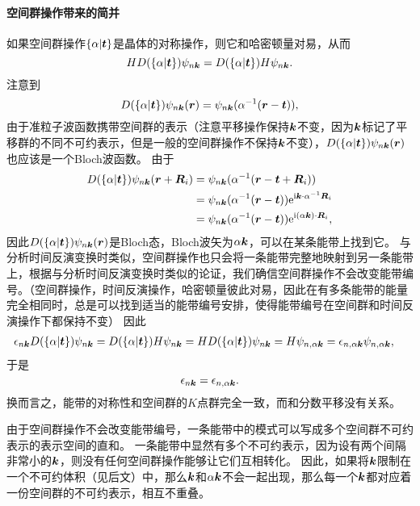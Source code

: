 \paragraph{空间群操作带来的简并} 如果空间群操作$\{ \alpha | \vb*{t} \}$是晶体的对称操作，则它和哈密顿量对易，从而
\[
    H D(\{ \alpha | \vb*{t} \}) \psi_{n \vb*{k}} = D(\{ \alpha | \vb*{t} \}) H \psi_{n \vb*{k}}.
\]
注意到
\[
    D(\{ \alpha | \vb*{t} \}) \psi_{n \vb*{k}} (\vb*{r}) = \psi_{n \vb*{k}} (\alpha^{-1} (\vb*{r} - \vb*{t})),
\]
由于准粒子波函数携带空间群的表示（注意平移操作保持$\vb*{k}$不变，因为$\vb*{k}$标记了平移群的不同不可约表示，但是一般的空间群操作不保持$\vb*{k}$不变），$D(\{ \alpha | \vb*{t} \}) \psi_{n \vb*{k}} (\vb*{r})$也应该是一个Bloch波函数。
由于
\[
    \begin{aligned}
        D(\{ \alpha | \vb*{t} \}) \psi_{n \vb*{k}} (\vb*{r} + \vb*{R}_i) &= \psi_{n \vb*{k}} (\alpha^{-1} (\vb*{r} - \vb*{t} + \vb*{R}_i)) \\
        &= \psi_{n \vb*{k}} (\alpha^{-1} (\vb*{r} - \vb*{t})) \mathrm{e}^{\mathrm{i} \vb*{k} \cdot \alpha^{-1} \vb*{R}_i} \\
        &= \psi_{n \vb*{k}} (\alpha^{-1} (\vb*{r} - \vb*{t})) \mathrm{e}^{\mathrm{i} (\alpha \vb*{k}) \cdot \vb*{R}_i} ,
    \end{aligned}
\]
因此$D(\{ \alpha | \vb*{t} \}) \psi_{n \vb*{k}} (\vb*{r})$是Bloch态，Bloch波矢为$\alpha \vb*{k}$，可以在某条能带上找到它。
与分析时间反演变换时类似，空间群操作也只会将一条能带完整地映射到另一条能带上，根据与分析时间反演变换时类似的论证，我们确信空间群操作不会改变能带编号。（空间群操作，时间反演操作，哈密顿量彼此对易，因此在有多条能带的能量完全相同时，总是可以找到适当的能带编号安排，使得能带编号在空间群和时间反演操作下都保持不变）
因此
\[
    \begin{aligned}
        \epsilon_{n \vb*{k}} D(\{\alpha | \vb*{t}\}) \psi_{n \vb*{k}} &= D(\{ \alpha | \vb*{t} \}) H \psi_{n \vb*{k}} = H D(\{ \alpha | \vb*{t} \}) \psi_{n \vb*{k}} = H \psi_{n, \alpha \vb*{k}} = \epsilon_{n, \alpha \vb*{k}} \psi_{n, \alpha \vb*{k}},
    \end{aligned}
\]
于是
\begin{equation}
    \epsilon_{n \vb*{k}} = \epsilon_{n, \alpha \vb*{k}}.
\end{equation}
换而言之，能带的对称性和空间群的$K$点群完全一致，而和分数平移没有关系。

由于空间群操作不会改变能带编号，一条能带中的模式可以写成多个空间群不可约表示的表示空间的直和。
一条能带中显然有多个不可约表示，因为设有两个间隔非常小的$\vb*{k}$，则没有任何空间群操作能够让它们互相转化。
因此，如果将$\vb*{k}$限制在一个不可约体积（见后文）中，那么$\vb*{k}$和$\alpha \vb*{k}$不会一起出现，那么每一个$\vb*{k}$都对应着一份空间群的不可约表示，相互不重叠。

